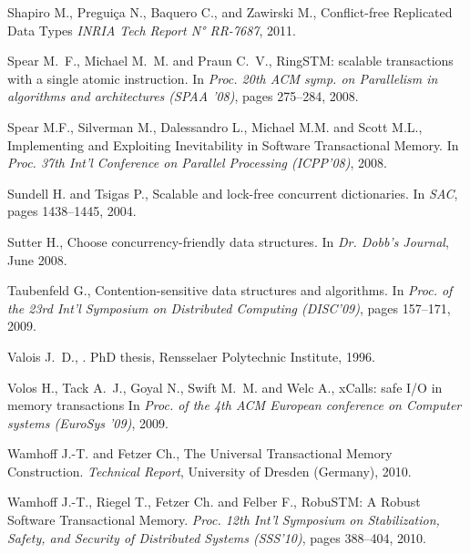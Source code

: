 \begin{thebibliography}{99}
{
Shapiro M., Pregui{\c c}a N., Baquero C., and Zawirski M.,
Conflict-free Replicated Data Types
{\it INRIA Tech Report N° RR-7687}, 2011.




Spear M.~F., Michael M.~M. and Praun C.~V.,
\newblock RingSTM: scalable transactions with a single atomic instruction.
\newblock In {\em Proc. 20th ACM symp. on Parallelism in algorithms and architectures (SPAA '08)}, pages 275--284, 2008. 


Spear M.F., Silverman M., Dalessandro L., Michael M.M.  and Scott M.L., 
Implementing and Exploiting Inevitability in Software Transactional Memory.
In {\it Proc. 37th Int'l Conference on Parallel Processing (ICPP'08)}, 2008.


Sundell H. and Tsigas P.,
\newblock Scalable and lock-free concurrent dictionaries.
\newblock In {\em SAC}, pages 1438--1445, 2004.



Sutter H.,
\newblock Choose concurrency-friendly data structures.
\newblock In {\em Dr. Dobb's Journal}, June 2008.


Taubenfeld G.,
\newblock Contention-sensitive data structures and algorithms.
\newblock In {\em Proc. of the 23rd Int'l Symposium on Distributed Computing (DISC'09)}, pages 157--171, 2009.




Valois J.~D.,
.
\newblock PhD thesis, Rensselaer Polytechnic Institute, 1996.


Volos H., Tack A.~J., Goyal N., Swift M.~M. and Welc A.,
\newblock xCalls: safe I/O in memory transactions
\newblock In {\em Proc. of the 4th ACM European conference on Computer systems (EuroSys '09)}, 2009.


Wamhoff J.-T. and   Fetzer Ch., 
The Universal Transactional Memory Construction. 
{\it Technical Report}, University of Dresden (Germany), 2010. 
 

Wamhoff J.-T.,   Riegel T.,  Fetzer Ch. and  Felber F., 
RobuSTM: A Robust Software Transactional Memory.
{\it Proc. 12th Int'l Symposium on  Stabilization, Safety, and Security 
of Distributed Systems (SSS'10)}, pages  388--404,  2010.

}
\end{thebibliography}

